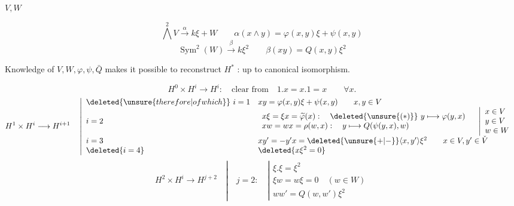 \begin{flushright}\end{flushright}

$V,W$

\[
\bigwedge^2 V\xrightarrow{\alpha}k\xi+W
\qquad \alpha(x\wedge y)=\varphi(x,y)\xi+\psi(x,y)
\]
\[
\operatorname{Sym}^2(W)\xrightarrow{\beta}k\xi^2
\qquad \beta(xy)=Q(x,y)\xi^2
\]

Knowledge of $V,W,\varphi,\psi,\bar Q$ makes it possible to reconstruct $H^*$ :
up to canonical isomorphism.

\[
H^0\times H^i\longrightarrow H^i:\quad\text{clear from}\quad
1.x=x.1=x\qquad\forall x.
\]
\[
H^1\times H^i\longrightarrow H^{i+1}\quad
\left|\begin{array}{ll}
\deleted{\unsure{therefore|of which}}\ i=1&xy=\varphi(x,y)\xi+\psi(x,y)\qquad x,y\in V\\
i=2&\begin{array}{l}
x\xi=\xi x=\widetilde\varphi(x):\quad\deleted{\unsure{(*)}}\ y\longmapsto\varphi(y,x)\\
xw=wx=\rho(w,x):\quad y\longmapsto Q(\psi(y,x),w)
\end{array}\quad\left|\begin{array}{l}x\in V\\y\in V\\w\in W\end{array}\right.\\
i=3&xy'=-y'x=\deleted{\unsure{+|-}}\langle x,y'\rangle\xi^2\qquad x\in V,y'\in\check V\\
\deleted{i=4}&\deleted{x\xi^2=0}
\end{array}\right.
\]
\[
H^2\times H^i\longrightarrow H^{j+2}\quad
\left|\quad j=2:\quad\left|\begin{array}{l}
\xi.\xi=\xi^2\\
\xi w=w\xi=0\quad(w\in W)\\
ww'=Q(w,w')\xi^2
\end{array}\right.\right.
\]

